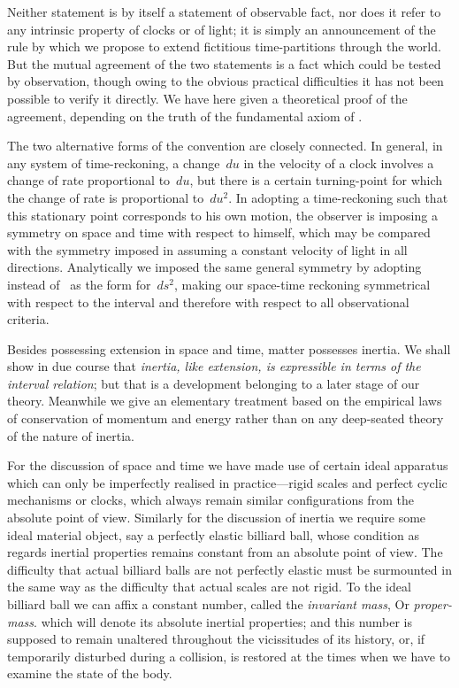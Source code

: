 \documentclass[12pt]{book}
\begin{document}
Neither statement is by itself a statement of observable fact, nor does it
refer to any intrinsic property of clocks or of light; it is simply an announcement
of the rule by which we propose to extend fictitious time-partitions
through the world. But the mutual agreement of the two statements is a fact
which could be tested by observation, though owing to the obvious practical
difficulties it has not been possible to verify it directly. We have here given
a theoretical proof of the agreement, depending on the truth of the fundamental
axiom of .

The two alternative forms of the convention are closely connected. In
general, in any system of time-reckoning, a change~$du$ in the velocity of a
clock involves a change of rate proportional to~$du$, but there is a certain
turning-point for which the change of rate is proportional to~$du^{2}$. In adopting
a time-reckoning such that this stationary point corresponds to his own
motion, the observer is imposing a symmetry on space and time with respect
to himself, which may be compared with the symmetry imposed in assuming
a constant velocity of light in all directions. Analytically we imposed the
same general symmetry by adopting  instead of~ as the form for~$ds^{2}$,
making our space-time reckoning symmetrical with respect to the interval
and therefore with respect to all observational criteria.

%

Besides possessing extension in space and time, matter possesses inertia.
%
We shall show in due course that \emph{inertia, like extension, is expressible in terms
of the interval relation}; but that is a development belonging to a later stage
of our theory. Meanwhile we give an elementary treatment based on the
empirical laws of conservation of momentum and energy rather than on any
deep-seated theory of the nature of inertia.

For the discussion of space and time we have made use of certain ideal
apparatus which can only be imperfectly realised in practice---rigid scales and
perfect cyclic mechanisms or clocks, which always remain similar configurations
from the absolute point of view. Similarly for the discussion of inertia
we require some ideal material object, say a perfectly elastic billiard ball, whose
condition as regards inertial properties remains constant from an absolute
point of view. The difficulty that actual billiard balls are not perfectly elastic
must be surmounted in the same way as the difficulty that actual scales are
not rigid. To the ideal billiard ball we can affix a constant number, called
the \emph{invariant mass}\footnotemark,\footnotetext
  {Or \emph{proper-mass}.}
which will denote its absolute inertial properties; and
%
%
%
%
this number is supposed to remain unaltered throughout the vicissitudes of
its history, or, if temporarily disturbed during a collision, is restored at the
times when we have to examine the state of the body.
\end{document}
